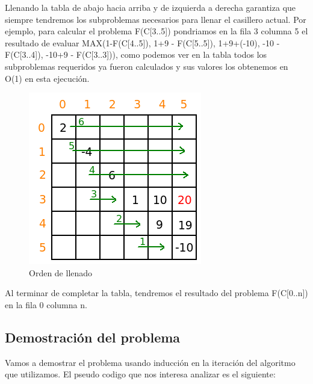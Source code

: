 Llenando la tabla de abajo hacia arriba y de izquierda a derecha garantiza que siempre tendremos los subproblemas necesarios para llenar el casillero actual. Por ejemplo, para calcular el problema F(C[3..5]) pondriamos en la fila 3 columna 5 el resultado de evaluar MAX(1-F(C[4..5]), 1+9 - F(C[5..5]), 1+9+(-10), -10 - F(C[3..4]), -10+9 - F(C[3..3])), como podemos ver en la tabla todos los subproblemas requeridos ya fueron calculados y sus valores los obtenemos en O(1) en esta ejecuci\'on.

\begin{figure}[h]
\begin{center}
\includegraphics[scale=0.6]{./img/ej1_res4.png}
\caption{Orden de llenado}
\end{center}
\end{figure}

Al terminar de completar la tabla, tendremos el resultado del problema F(C[0..n]) en la fila 0 columna n.

\newpage
\subsection{Demostraci\'on del problema}

Vamos a demostrar el problema usando inducci\'on en la iteraci\'on del algoritmo que utilizamos. El pseudo codigo que nos interesa analizar es el siguiente:


